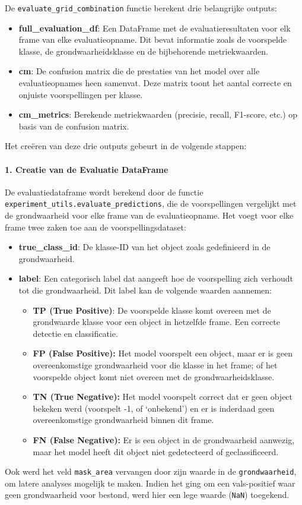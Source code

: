De \texttt{evaluate\_grid\_combination} functie berekent drie belangrijke outputs:
\begin{itemize}
    \item \textbf{full\_evaluation\_df}: Een DataFrame met de evaluatieresultaten voor elk frame van elke evaluatieopname.
    Dit bevat informatie zoals de voorspelde klasse, de grondwaarheidsklasse en de bijbehorende metriekwaarden.
    \item \textbf{cm}: De confusion matrix die de prestaties van het model over alle evaluatieopnames heen samenvat.
    Deze matrix toont het aantal correcte en onjuiste voorspellingen per klasse.
    \item \textbf{cm\_metrics}: Berekende metriekwaarden (precisie, recall, F1-score, etc.) op basis van de confusion matrix.
\end{itemize}

Het creëren van deze drie outputs gebeurt in de volgende stappen:

\paragraph{1. Creatie van de Evaluatie DataFrame}
De evaluatiedataframe wordt berekend door de functie \texttt{experiment\_utils.evaluate\_predictions},
die de voorspellingen vergelijkt met de grondwaarheid voor elke frame van de evaluatieopname.
Het voegt voor elke frame twee zaken toe aan de voorspellingsdataset:
\begin{itemize}
    \item \textbf{true\_class\_id}: De klasse-ID van het object zoals gedefinieerd in de grondwaarheid.
    \item \textbf{label}: Een categorisch label dat aangeeft hoe de voorspelling zich verhoudt tot die grondwaarheid. Dit label kan de volgende waarden aannemen:
        \begin{itemize}
            \item \textbf{TP (True Positive)}: De voorspelde klasse komt overeen met de grondwaarde klasse voor een object in hetzelfde frame. 
            Een correcte detectie en classificatie.
            \item \textbf{FP (False Positive):} Het model voorspelt een object, maar er is geen overeenkomstige grondwaarheid 
            voor die klasse in het frame; of het voorspelde object komt niet overeen met de grondwaarheidsklasse.
            \item \textbf{TN (True Negative):} Het model voorspelt correct dat er geen object bekeken werd (voorspelt -1, of `onbekend') 
            en er is inderdaad geen overeenkomstige grondwaarheid binnen dit frame.
            \item \textbf{FN (False Negative):} Er is een object in de grondwaarheid aanwezig, maar het model heeft dit object niet gedetecteerd of geclassificeerd.
        \end{itemize} 
\end{itemize}
Ook werd het veld \texttt{mask\_area} vervangen door zijn waarde in de \texttt{grondwaarheid}, om latere analyses mogelijk te maken.
Indien het ging om een vals-positief waar geen grondwaarheid voor bestond, werd hier een lege waarde (\texttt{NaN}) toegekend. 

